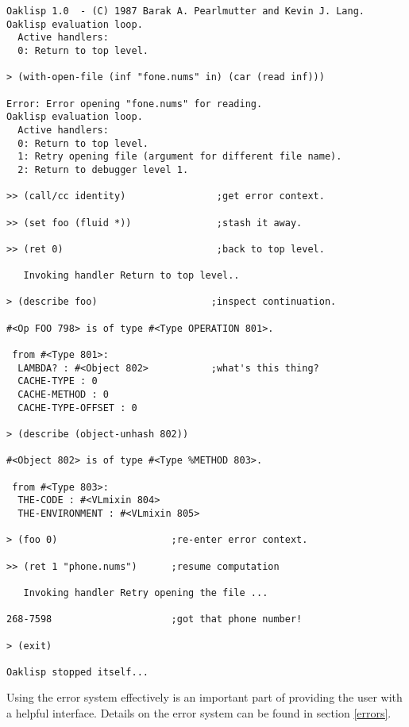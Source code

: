 \begin{verbatim}
Oaklisp 1.0  - (C) 1987 Barak A. Pearlmutter and Kevin J. Lang.
Oaklisp evaluation loop.
  Active handlers:
  0: Return to top level.

> (with-open-file (inf "fone.nums" in) (car (read inf)))

Error: Error opening "fone.nums" for reading.
Oaklisp evaluation loop.
  Active handlers:
  0: Return to top level.
  1: Retry opening file (argument for different file name).
  2: Return to debugger level 1.

>> (call/cc identity)                ;get error context.

>> (set foo (fluid *))               ;stash it away.

>> (ret 0)                           ;back to top level.

   Invoking handler Return to top level..

> (describe foo)                    ;inspect continuation.

#<Op FOO 798> is of type #<Type OPERATION 801>.

 from #<Type 801>:
  LAMBDA? : #<Object 802>           ;what's this thing?
  CACHE-TYPE : 0
  CACHE-METHOD : 0
  CACHE-TYPE-OFFSET : 0

> (describe (object-unhash 802))

#<Object 802> is of type #<Type %METHOD 803>.

 from #<Type 803>:
  THE-CODE : #<VLmixin 804>
  THE-ENVIRONMENT : #<VLmixin 805>

> (foo 0)                    ;re-enter error context.

>> (ret 1 "phone.nums")      ;resume computation

   Invoking handler Retry opening the file ...

268-7598                     ;got that phone number!

> (exit)

Oaklisp stopped itself...
\end{verbatim}

Using the error system effectively is an important part of providing
the user with a helpful interface.  Details on the error system can be
found in section \ref{errors}.
